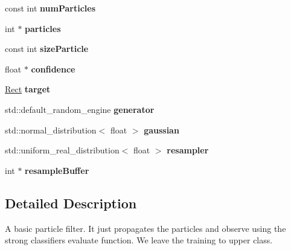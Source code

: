 \begin{DoxyCompactItemize}
\item 
\hypertarget{classParticleFilter_a76cca3c44c00837d85751bb913280361}{}const int {\bfseries num\+Particles}\label{classParticleFilter_a76cca3c44c00837d85751bb913280361}

\item 
\hypertarget{classParticleFilter_a0175a0c46621095d013e8fc539b94eed}{}int $\ast$ {\bfseries particles}\label{classParticleFilter_a0175a0c46621095d013e8fc539b94eed}

\item 
\hypertarget{classParticleFilter_affbf0bd98b03f8c047db2106c40ecfd1}{}const int {\bfseries size\+Particle}\label{classParticleFilter_affbf0bd98b03f8c047db2106c40ecfd1}

\item 
\hypertarget{classParticleFilter_a68e04e60c13a06afc10bcce6b4d056b6}{}float $\ast$ {\bfseries confidence}\label{classParticleFilter_a68e04e60c13a06afc10bcce6b4d056b6}

\item 
\hypertarget{classParticleFilter_aa97f15d13d905348953cdc3122871255}{}\hyperlink{classRect}{Rect} {\bfseries target}\label{classParticleFilter_aa97f15d13d905348953cdc3122871255}

\item 
\hypertarget{classParticleFilter_a10b276ac5acdc39a1c7f5fc89dc9529d}{}std\+::default\+\_\+random\+\_\+engine {\bfseries generator}\label{classParticleFilter_a10b276ac5acdc39a1c7f5fc89dc9529d}

\item 
\hypertarget{classParticleFilter_a861497b4329e28e078d7ebfa381baae9}{}std\+::normal\+\_\+distribution$<$ float $>$ {\bfseries gaussian}\label{classParticleFilter_a861497b4329e28e078d7ebfa381baae9}

\item 
\hypertarget{classParticleFilter_aa6149560d37c102c0e96b2b0cd9b696b}{}std\+::uniform\+\_\+real\+\_\+distribution$<$ float $>$ {\bfseries resampler}\label{classParticleFilter_aa6149560d37c102c0e96b2b0cd9b696b}

\item 
\hypertarget{classParticleFilter_a23a3c5e7016d74cf775031b612c19839}{}int $\ast$ {\bfseries resample\+Buffer}\label{classParticleFilter_a23a3c5e7016d74cf775031b612c19839}

\end{DoxyCompactItemize}


\subsection{Detailed Description}
A basic particle filter. It just propagates the particles and observe using the strong classifier\textquotesingle{}s evaluate function. We leave the training to upper class.

